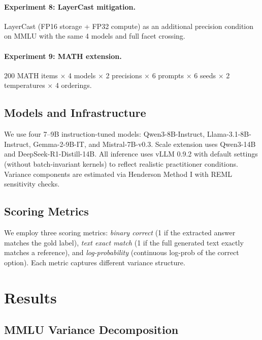 \documentclass[11pt,twocolumn]{article}
\begin{document}
\paragraph{Experiment 8: LayerCast mitigation.} LayerCast (FP16 storage + FP32 compute) as an additional precision condition on MMLU with the same 4 models and full facet crossing.

\paragraph{Experiment 9: MATH extension.} 200 MATH items $\times$ 4 models $\times$ 2 precisions $\times$ 6 prompts $\times$ 6 seeds $\times$ 2 temperatures $\times$ 4 orderings.

\subsection{Models and Infrastructure}

We use four 7--9B instruction-tuned models: Qwen3-8B-Instruct, Llama-3.1-8B-Instruct, Gemma-2-9B-IT, and Mistral-7B-v0.3. Scale extension uses Qwen3-14B and DeepSeek-R1-Distill-14B. All inference uses vLLM 0.9.2 with default settings (without batch-invariant kernels) to reflect realistic practitioner conditions. Variance components are estimated via Henderson Method I with REML sensitivity checks.

\subsection{Scoring Metrics}

We employ three scoring metrics: \emph{binary correct} (1 if the extracted answer matches the gold label), \emph{text exact match} (1 if the full generated text exactly matches a reference), and \emph{log-probability} (continuous log-prob of the correct option). Each metric captures different variance structure.

\section{Results}

\subsection{MMLU Variance Decomposition}
\label{sec:mmlu}
\end{document}
